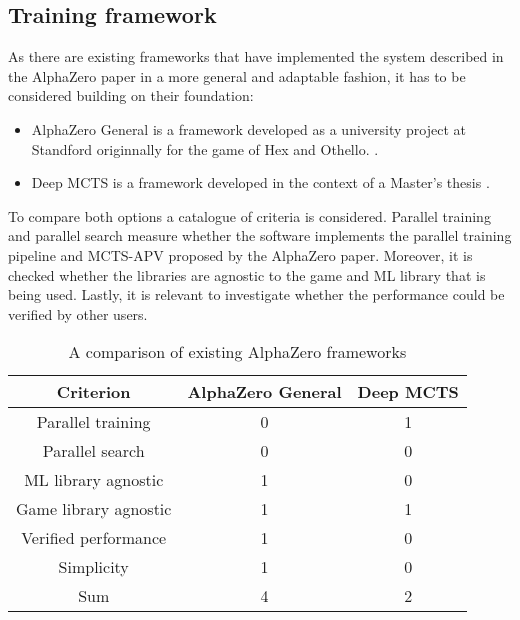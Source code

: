 \subsection{Training framework}
As there are existing frameworks that have implemented the system described in the AlphaZero paper in a more general and adaptable fashion, it has to be considered building on their foundation:
\begin{itemize}
    \item AlphaZero General is a framework developed as a university project at Standford originnally for the game of Hex and Othello. \cite{thakoor_learning_nodate,thakoor_suragnairalpha-zero-general_nodate}.
    \item Deep MCTS is a framework developed in the context of a Master's thesis \cite{bruasdal_deep_2020,henribru_deep_2021}.
\end{itemize}

To compare both options a catalogue of criteria is considered. Parallel training and parallel search measure whether the software implements the parallel training pipeline and MCTS-APV proposed by the AlphaZero paper. Moreover, it is checked whether the libraries are agnostic to the game and ML library that is being used. Lastly, it is relevant to investigate whether the performance could be verified by other users.

\begin{table*}
    \begin{center}
        \begin{tabular}{ c|c|c }
            Criterion             & AlphaZero General & Deep MCTS \\
            \hline
            \hline
            Parallel training     & 0                 & 1         \\
            Parallel search       & 0                 & 0         \\
            ML library agnostic   & 1                 & 0         \\
            Game library agnostic & 1                 & 1         \\
            Verified performance  & 1                 & 0         \\
            Simplicity            & 1                 & 0         \\
            \hline
            \hline
            Sum                   & 4                 & 2         \\
        \end{tabular}
    \end{center}
    \caption{A comparison of existing AlphaZero frameworks}\label{training_framework_comparison}
\end{table*}

